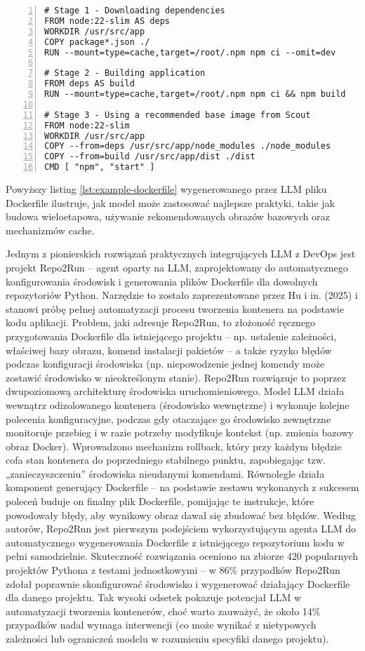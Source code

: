 \begin{lstlisting}[caption={Dockerfile wygenerowany przez LLM},label={lst:example-dockerfile},captionpos=b,numbers=left]
# Stage 1 - Downloading dependencies
FROM node:22-slim AS deps
WORKDIR /usr/src/app
COPY package*.json ./
RUN --mount=type=cache,target=/root/.npm npm ci --omit=dev

# Stage 2 - Building application
FROM deps AS build
RUN --mount=type=cache,target=/root/.npm npm ci && npm build

# Stage 3 - Using a recommended base image from Scout
FROM node:22-slim
WORKDIR /usr/src/app
COPY --from=deps /usr/src/app/node_modules ./node_modules
COPY --from=build /usr/src/app/dist ./dist
CMD [ "npm", "start" ]    
\end{lstlisting}

Powyższy listing \ref{lst:example-dockerfile} wygenerowanego przez LLM pliku Dockerfile ilustruje, jak model może zastosować najlepsze praktyki, takie jak budowa wieloetapowa, używanie rekomendowanych obrazów bazowych oraz mechanizmów cache.

Jednym z pionierskich rozwiązań praktycznych integrujących LLM z DevOps jest projekt Repo2Run – agent oparty na LLM, zaprojektowany do automatycznego konfigurowania środowisk i generowania plików Dockerfile dla dowolnych repozytoriów Python. Narzędzie to zostało zaprezentowane przez Hu i in. (2025) \cite{hu_llm-based_2025} i stanowi próbę pełnej automatyzacji procesu tworzenia kontenera na podstawie kodu aplikacji. Problem, jaki adresuje Repo2Run, to złożoność ręcznego przygotowania Dockerfile dla istniejącego projektu – np. ustalenie zależności, właściwej bazy obrazu, komend instalacji pakietów – a także ryzyko błędów podczas konfiguracji środowiska (np. niepowodzenie jednej komendy może zostawić środowisko w nieokreślonym stanie). Repo2Run rozwiązuje to poprzez dwupoziomową architekturę środowiska uruchomieniowego. Model LLM działa wewnątrz odizolowanego kontenera (środowisko wewnętrzne) i wykonuje kolejne polecenia konfiguracyjne, podczas gdy otaczające go środowisko zewnętrzne monitoruje przebieg i w razie potrzeby modyfikuje kontekst (np. zmienia bazowy obraz Docker). Wprowadzono mechanizm rollback, który przy każdym błędzie cofa stan kontenera do poprzedniego stabilnego punktu, zapobiegając tzw. „zanieczyszczeniu” środowiska nieudanymi komendami. Równolegle działa komponent generujący Dockerfile – na podstawie zestawu wykonanych z sukcesem poleceń buduje on finalny plik Dockerfile, pomijając te instrukcje, które powodowały błędy, aby wynikowy obraz dawał się zbudować bez błędów. Według autorów, Repo2Run jest pierwszym podejściem wykorzystującym agenta LLM do automatycznego wygenerowania Dockerfile z istniejącego repozytorium kodu w pełni samodzielnie. Skuteczność rozwiązania oceniono na zbiorze 420 popularnych projektów Pythona z testami jednostkowymi – w 86\% przypadków Repo2Run zdołał poprawnie skonfigurować środowisko i wygenerować działający Dockerfile dla danego projektu. Tak wysoki odsetek pokazuje potencjał LLM w automatyzacji tworzenia kontenerów, choć warto zauważyć, że około 14\% przypadków nadal wymaga interwencji (co może wynikać z nietypowych zależności lub ograniczeń modelu w rozumieniu specyfiki danego projektu).

